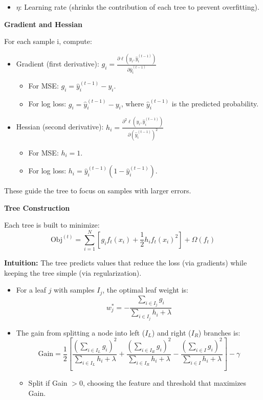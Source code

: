 \begin{itemize}
    \item $\eta$: Learning rate (shrinks the contribution of each tree to prevent overfitting).
\end{itemize}

\smallskip
\textbf{Gradient and Hessian}

For each sample i, compute:
\begin{itemize}
    \item Gradient (first derivative): $g_i = \frac{\partial \ell(y_i, \hat{y}_i^{(t-1)})}{\partial \hat{y}_i^{(t-1)}}$
          \begin{itemize}
              \item For MSE: $g_i = \hat{y}_i^{(t-1)} - y_i$.
              \item For log loss: $g_i = \hat{y}_i^{(t-1)} - y_i$, where $\hat{y}_i^{(t-1)}$ is the predicted probability.
          \end{itemize}
          \medskip
    \item Hessian (second derivative): $h_i = \frac{\partial^2 \ell(y_i, \hat{y}_i^{(t-1)})}{\partial (\hat{y}_i^{(t-1)})^2}$
          \begin{itemize}
              \item For MSE: $h_i = 1$.
              \item For log loss: $h_i = \hat{y}_i^{(t-1)} (1 - \hat{y}_i^{(t-1)})$.
          \end{itemize}
\end{itemize}

These guide the tree to focus on samples with larger errors.

\textbf{Tree Construction}

Each tree is built to minimize:
\[\text{Obj}^{(t)} = \sum_{i=1}^N [g_i f_t(x_i) + \frac{1}{2} h_i f_t(x_i)^2] + \Omega(f_t)\]

\textbf{Intuition:} The tree predicts values that reduce the loss (via gradients) while keeping the tree simple (via regularization).

\begin{itemize}
    \item For a leaf $j$ with samples $I_j$, the optimal leaf weight is:
    \[w_j^* = -\frac{\sum_{i \in I_j} g_i}{\sum_{i \in I_j} h_i + \lambda}\]

    \item The gain from splitting a node into left ($I_L$) and right ($I_R$) branches is:
    \[\text{Gain} = \frac{1}{2} \left[ \frac{(\sum_{i \in I_L} g_i)^2}{\sum_{i \in I_L} h_i + \lambda} + \frac{(\sum_{i \in I_R} g_i)^2}{\sum_{i \in I_R} h_i + \lambda} - \frac{(\sum_{i \in I} g_i)^2}{\sum_{i \in I} h_i + \lambda} \right] - \gamma\]
    \begin{itemize}
        \item Split if Gain $> 0$, choosing the feature and threshold that maximizes Gain.
    \end{itemize}
\end{itemize}

